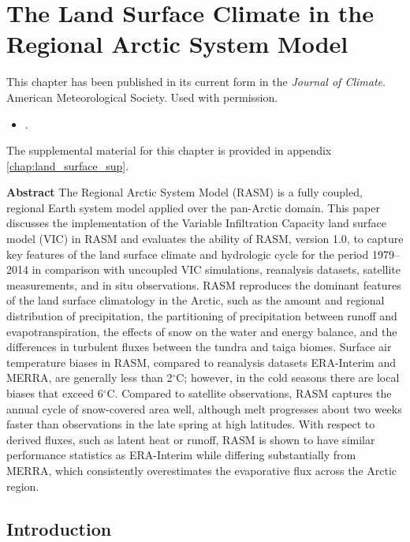 
\chapter{The Land Surface Climate in the Regional Arctic System Model}
\label{chap:land_surface}

This chapter has been published in its current form in the \textit{Journal of Climate}.
\textcopyright American Meteorological Society.
Used with permission.
\begin{itemize}
    \item {}.
\end{itemize}

The supplemental material for this chapter is provided in appendix \ref{chap:land_surface_sup}.

{\bf Abstract}
The Regional Arctic System Model (RASM) is a fully coupled, regional Earth system model applied over the pan-Arctic domain.
This paper discusses the implementation of the Variable Infiltration Capacity land surface model (VIC) in RASM and evaluates the ability of RASM, version 1.0, to capture key features of the land surface climate and hydrologic cycle for the period 1979–2014 in comparison with uncoupled VIC simulations, reanalysis datasets, satellite measurements, and in situ observations.
RASM reproduces the dominant features of the land surface climatology in the Arctic, such as the amount and regional distribution of precipitation, the partitioning of precipitation between runoff and evapotranspiration, the effects of snow on the water and energy balance, and the differences in turbulent fluxes between the tundra and taiga biomes.
Surface air temperature biases in RASM, compared to reanalysis datasets ERA-Interim and MERRA, are generally less than 2$^{\circ}$C; however, in the cold seasons there are local biases that exceed 6$^{\circ}$C.
Compared to satellite observations, RASM captures the annual cycle of snow-covered area well, although melt progresses about two weeks faster than observations in the late spring at high latitudes.
With respect to derived fluxes, such as latent heat or runoff, RASM is shown to have similar performance statistics as ERA-Interim while differing substantially from MERRA, which consistently overestimates the evaporative flux across the Arctic region.

\section{Introduction}
\label{sec:intro_ch3}


